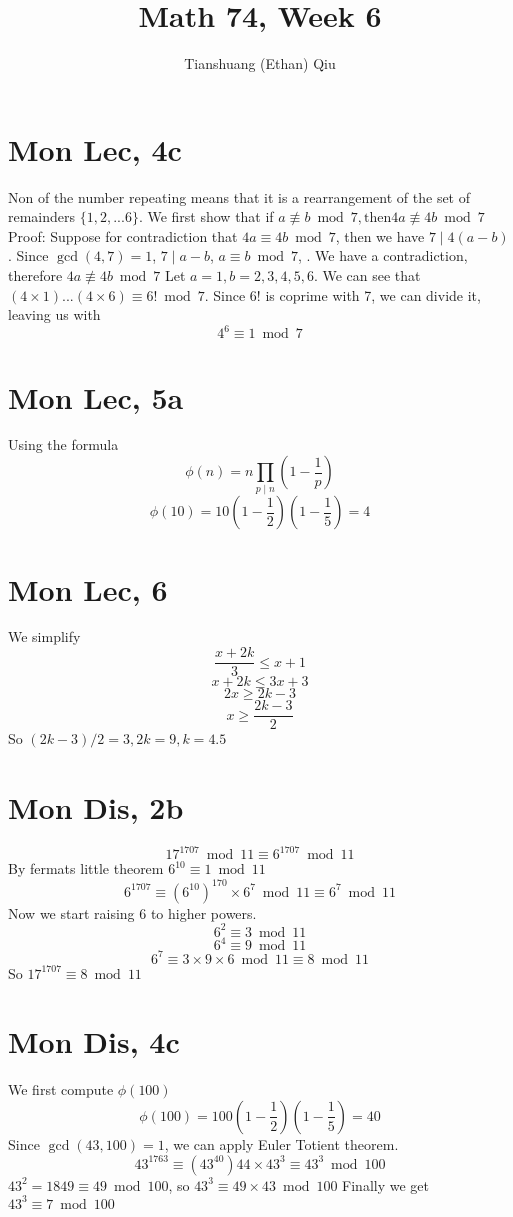 \documentclass[12pt]{article}
\author{Tianshuang (Ethan) Qiu}
\begin{document}
\title{Math 74, Week 6}
\maketitle

\section{Mon Lec, 4c}
Non of the number repeating means that it is a rearrangement of the set of remainders $\{1,2,...6\}$. We first show that if $a \not \equiv b \bmod 7, \text{then} 4a \not \equiv 4b \bmod 7$
\newline
Proof:
Suppose for contradiction that $4a \equiv 4b \bmod 7$, then we have $7 \mid 4(a-b)$. Since $\gcd(4,7)=1$, $7 \mid a-b$, $a \equiv b \bmod 7$, \lightning. We have a contradiction, therefore $4a \not \equiv 4b \bmod 7$
\newline
Let $a=1, b = 2,3,4,5,6$. We can see that $(4 \times 1)...(4 \times 6) \equiv 6! \bmod 7$. Since 6! is coprime with 7, we can divide it, leaving us with
$$4^6 \equiv 1 \bmod 7$$

\section{Mon Lec, 5a}
Using the formula
$$\phi(n) = n \prod _{p \mid n}(1-\frac{1}{p})$$
$$\phi(10) = 10(1-\frac{1}{2})(1-\frac{1}{5}) = 4$$

\section{Mon Lec, 6}
We simplify
$$\frac{x+2k}{3} \leq x+1$$
$$x+2k \leq 3x+3$$
$$2x \geq 2k-3$$
$$x \geq \frac{2k-3}{2}$$
So $(2k-3)/2 = 3, 2k = 9, k = 4.5$
\newpage


\section{Mon Dis, 2b}
$$17 ^ {1707} \bmod 11 \equiv 6^{1707}\bmod 11$$
By fermats little theorem $6^10 \equiv 1 \bmod 11$
$$6^1707 \equiv (6^10)^170 \times 6^7 \bmod 11 \equiv 6^7 \bmod 11$$
Now we start raising 6 to higher powers.
$$6^2 \equiv 3 \bmod 11$$
$$6^4 \equiv 9 \bmod 11$$
$$6^7 \equiv 3\times9\times6 \bmod 11 \equiv 8 \bmod 11$$
So $17 ^ {1707} \equiv 8 \bmod 11$

\section{Mon Dis, 4c}
We first compute $\phi(100)$
$$\phi(100)=100(1-\frac{1}{2})(1-\frac{1}{5}) = 40$$
Since $\gcd(43,100)=1$, we can apply Euler Totient theorem.
$$43^{1763} \equiv (43^{40}){44} \times 43^3 \equiv 43^3 \bmod 100$$
$43^2 = 1849 \equiv 49 \bmod 100$, so $43^3 \equiv 49 \times 43 \bmod 100$
Finally we get $43^3 \equiv 7 \bmod 100$
\newpage
\end{document}
